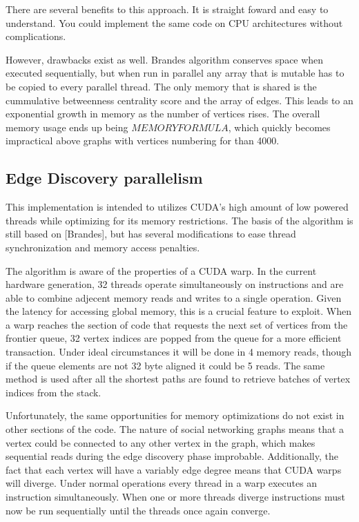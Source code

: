 \documentclass[12pt,twocolumn]{article}
\begin{document}
There are several benefits to this approach. It is straight foward and easy to understand. You could implement the same code on CPU architectures without complications.
 
However, drawbacks exist as well. Brandes algorithm conserves space when executed sequentially, but when run in parallel any array that is mutable has to be copied to every parallel thread. The only memory that is shared is the cummulative betweenness centrality score and the array of edges. This leads to an exponential growth in memory as the number of vertices rises. The overall memory usage ends up being $MEMORY FORMULA$, which quickly becomes impractical above graphs with vertices numbering for than 4000.
 
\subsection{Edge Discovery parallelism}
This implementation is intended to utilizes CUDA's high amount of low powered threads while optimizing for its memory restrictions. The basis of the algorithm is still based on [Brandes], but has several modifications to ease thread synchronization and memory access penalties.
 
The algorithm is aware of the properties of a CUDA warp. In the current hardware generation, 32 threads operate simultaneously on instructions and are able to combine adjecent memory reads and writes to a single operation. Given the latency for accessing global memory, this is a crucial feature to exploit. When a warp reaches the section of code that requests the next set of vertices from the frontier queue, 32 vertex indices are popped from the queue for a more efficient transaction. Under ideal circumstances it will be done in 4 memory reads, though if the queue elements are not 32 byte aligned it could be 5 reads. The same method is used after all the shortest paths are found to retrieve batches of vertex indices from the stack.
 
Unfortunately, the same opportunities for memory optimizations do not exist in other sections of the code. The nature of social networking graphs means that a vertex could be connected to any other vertex in the graph, which makes sequential reads during the edge discovery phase improbable. Additionally, the fact that each vertex will have a variably edge degree means that CUDA warps will diverge. Under normal operations every thread in a warp executes an instruction simultaneously. When one or more threads diverge instructions must now be run sequentially until the threads once again converge.
 
\end{document}
